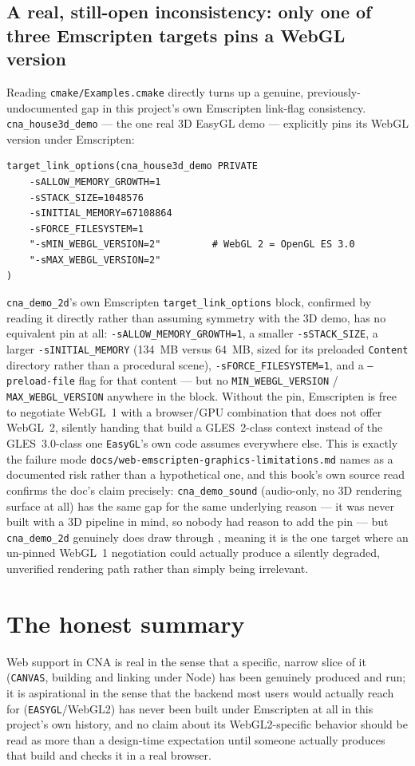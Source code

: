 \subsection{A real, still-open inconsistency: only one of three Emscripten targets pins a WebGL version}

Reading \texttt{cmake/Examples.cmake} directly turns up a genuine, previously-undocumented gap
in this project's own Emscripten link-flag consistency. \texttt{cna\_house3d\_demo} --- the one
real 3D EasyGL demo --- explicitly pins its WebGL version under Emscripten:

\begin{lstlisting}[style=cnashell]
target_link_options(cna_house3d_demo PRIVATE
    -sALLOW_MEMORY_GROWTH=1
    -sSTACK_SIZE=1048576
    -sINITIAL_MEMORY=67108864
    -sFORCE_FILESYSTEM=1
    "-sMIN_WEBGL_VERSION=2"         # WebGL 2 = OpenGL ES 3.0
    "-sMAX_WEBGL_VERSION=2"
)
\end{lstlisting}

\texttt{cna\_demo\_2d}'s own Emscripten \texttt{target\_link\_options} block, confirmed by
reading it directly rather than assuming symmetry with the 3D demo, has no equivalent pin at
all: \texttt{-sALLOW\_MEMORY\_GROWTH=1}, a smaller \texttt{-sSTACK\_SIZE}, a larger
\texttt{-sINITIAL\_MEMORY} (134~MB versus 64~MB, sized for its preloaded \texttt{Content}
directory rather than a procedural scene), \texttt{-sFORCE\_FILESYSTEM=1}, and a
\texttt{--preload-file} flag for that content --- but no \texttt{MIN\_WEBGL\_VERSION} /
\texttt{MAX\_WEBGL\_VERSION} anywhere in the block. Without the pin, Emscripten is free to
negotiate WebGL~1 with a browser/GPU combination that does not offer WebGL~2, silently handing
that build a GLES~2-class context instead of the GLES~3.0-class one \texttt{EasyGL}'s own code
assumes everywhere else. This is exactly the failure mode \texttt{docs/web-emscripten-graphics-limitations.md}
names as a documented risk rather than a hypothetical one, and this book's own source read
confirms the doc's claim precisely: \texttt{cna\_demo\_sound} (audio-only, no 3D rendering
surface at all) has the same gap for the same underlying reason --- it was never built with a
3D pipeline in mind, so nobody had reason to add the pin --- but \texttt{cna\_demo\_2d}
genuinely does draw through , meaning it is the one target where an
un-pinned WebGL~1 negotiation could actually produce a silently degraded, unverified rendering
path rather than simply being irrelevant.

\section{The honest summary}

Web support in CNA is real in the sense that a specific, narrow slice of it (\texttt{CANVAS},
building and linking under Node) has been genuinely produced and run; it is aspirational in
the sense that the backend most users would actually reach for (\texttt{EASYGL}/WebGL2) has
never been built under Emscripten at all in this project's own history, and no claim about
its WebGL2-specific behavior should be read as more than a design-time expectation until
someone actually produces that build and checks it in a real browser.
